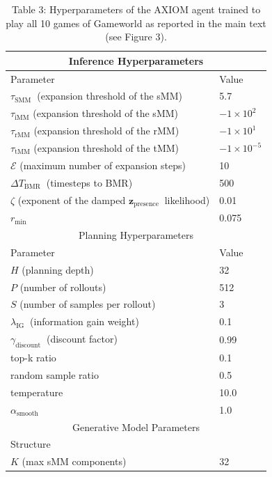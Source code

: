 \documentclass[10pt]{article}
\begin{document}
\begin{table}[h]
\begin{center}
\captionsetup{labelformat=empty}
\caption{Table 3: Hyperparameters of the AXIOM agent trained to play all 10 games of Gameworld as reported in the main text (see Figure 3).}
\begin{tabular}{|l|l|}
\hline
\multicolumn{2}{|c|}{Inference Hyperparameters} \\
\hline
Parameter & Value \\
\hline
$\tau_{\text {SMM }}$ (expansion threshold of the sMM) & 5.7 \\
\hline
$\tau_{\mathrm{iMM}}$ (expansion threshold of the sMM) & $-1 \times 10^{2}$ \\
\hline
$\tau_{\mathrm{rMM}}$ (expansion threshold of the rMM) & $-1 \times 10^{1}$ \\
\hline
$\tau_{\mathrm{tMM}}$ (expansion threshold of the tMM) & $-1 \times 10^{-5}$ \\
\hline
$\mathcal{E}$ (maximum number of expansion steps) & 10 \\
\hline
$\Delta T_{\text {BMR }}$ (timesteps to BMR) & 500 \\
\hline
$\zeta$ (exponent of the damped $\mathbf{z}_{\text {presence }}$ likelihood) & 0.01 \\
\hline
$r_{\text {min }}$ & 0.075 \\
\hline
\multicolumn{2}{|c|}{Planning Hyperparameters} \\
\hline
Parameter & Value \\
\hline
$H$ (planning depth) & 32 \\
\hline
$P$ (number of rollouts) & 512 \\
\hline
$S$ (number of samples per rollout) & 3 \\
\hline
$\lambda_{\text {IG }}$ (information gain weight) & 0.1 \\
\hline
$\gamma_{\text {discount }}$ (discount factor) & 0.99 \\
\hline
top-k ratio & 0.1 \\
\hline
random sample ratio & 0.5 \\
\hline
temperature & 10.0 \\
\hline
$\alpha_{\text {smooth }}$ & 1.0 \\
\hline
\multicolumn{2}{|c|}{Generative Model Parameters} \\
\hline
\multicolumn{2}{|l|}{Structure} \\
\hline
$K$ (max sMM components) & 32 \\

\end{tabular}
\end{center}
\end{table}
\end{document}

